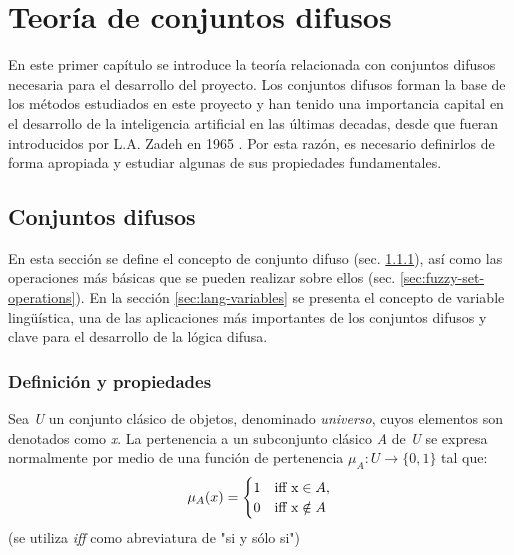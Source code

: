 \chapter{Teoría de conjuntos difusos}
\label{cha:teoria-conjuntos-difusos}

En este primer capítulo se introduce la teoría relacionada con conjuntos difusos necesaria para el desarrollo del proyecto. Los conjuntos difusos forman la base de los métodos estudiados en este proyecto y han tenido una importancia capital en el desarrollo de la inteligencia artificial en las últimas decadas, desde que fueran introducidos por L.A. Zadeh en 1965 \cite{Zadeh65}. Por esta razón, es necesario definirlos de forma apropiada y estudiar algunas de sus propiedades fundamentales.

\section{Conjuntos difusos}

En esta sección se define el concepto de conjunto difuso (sec. \ref{sec:fuzzy-set-definition-and-properties}), así como las operaciones más básicas que se pueden realizar sobre ellos (sec. \ref{sec:fuzzy-set-operations}). En la sección \ref{sec:lang-variables} se presenta el concepto de variable lingüística, una de las aplicaciones más importantes de los conjuntos difusos y clave para el desarrollo de la lógica difusa.

\subsection{Definición y propiedades}
\label{sec:fuzzy-set-definition-and-properties}
\begin{definition}
Sea \emph{U} un conjunto clásico de objetos, denominado \emph{universo}, cuyos elementos son denotados como \emph{x}. La pertenencia a un subconjunto clásico \emph{A} de \emph{U} se expresa normalmente por medio de una función de pertenencia $\mu_{A}:U\rightarrow\{0,1\}$ tal que:
\begin{equation}
\mu_{A}(x)=\begin{cases} 1 & \mbox{\normalfont iff } \mbox{x}\in A, \\ 0 & \mbox{\normalfont iff } \mbox{x}\notin A \end{cases}
\end{equation}
(se utiliza \emph{iff} como abreviatura de "si y sólo si")
\end{definition}


